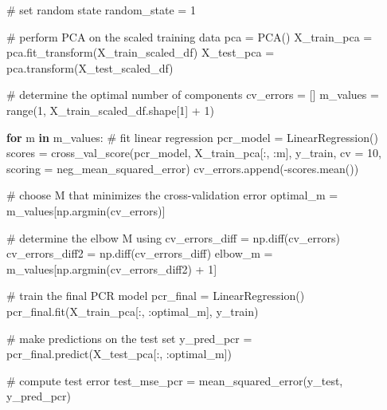 \documentclass[
  letterpaper,
  DIV=11,
  numbers=noendperiod]{scrartcl}
\newenvironment{Shaded}{\begin{snugshade}}{\end{snugshade}}
\newcommand{\BuiltInTok}[1]{\textcolor[rgb]{0.00,0.23,0.31}{#1}}
\newcommand{\CommentTok}[1]{\textcolor[rgb]{0.37,0.37,0.37}{#1}}
\newcommand{\ControlFlowTok}[1]{\textcolor[rgb]{0.00,0.23,0.31}{\textbf{#1}}}
\newcommand{\DecValTok}[1]{\textcolor[rgb]{0.68,0.00,0.00}{#1}}
\newcommand{\KeywordTok}[1]{\textcolor[rgb]{0.00,0.23,0.31}{\textbf{#1}}}
\newcommand{\NormalTok}[1]{\textcolor[rgb]{0.00,0.23,0.31}{#1}}
\newcommand{\OperatorTok}[1]{\textcolor[rgb]{0.37,0.37,0.37}{#1}}
\newcommand{\StringTok}[1]{\textcolor[rgb]{0.13,0.47,0.30}{#1}}
\begin{document}
\begin{Shaded}
\begin{Highlighting}[]
\CommentTok{\# set random state }
\NormalTok{random\_state }\OperatorTok{=} \DecValTok{1}

\CommentTok{\# perform PCA on the scaled training data}
\NormalTok{pca }\OperatorTok{=}\NormalTok{ PCA()}
\NormalTok{X\_train\_pca }\OperatorTok{=}\NormalTok{ pca.fit\_transform(X\_train\_scaled\_df)}
\NormalTok{X\_test\_pca }\OperatorTok{=}\NormalTok{ pca.transform(X\_test\_scaled\_df)}

\CommentTok{\# determine the optimal number of components }
\NormalTok{cv\_errors }\OperatorTok{=}\NormalTok{ []}
\NormalTok{m\_values }\OperatorTok{=} \BuiltInTok{range}\NormalTok{(}\DecValTok{1}\NormalTok{, X\_train\_scaled\_df.shape[}\DecValTok{1}\NormalTok{] }\OperatorTok{+} \DecValTok{1}\NormalTok{)}

\ControlFlowTok{for}\NormalTok{ m }\KeywordTok{in}\NormalTok{ m\_values:}
    \CommentTok{\# fit linear regression}
\NormalTok{    pcr\_model }\OperatorTok{=}\NormalTok{ LinearRegression()}
\NormalTok{    scores }\OperatorTok{=}\NormalTok{ cross\_val\_score(pcr\_model, X\_train\_pca[:, :m], y\_train, }
\NormalTok{                             cv }\OperatorTok{=} \DecValTok{10}\NormalTok{, scoring }\OperatorTok{=} \StringTok{\textquotesingle{}neg\_mean\_squared\_error\textquotesingle{}}\NormalTok{)}
\NormalTok{    cv\_errors.append(}\OperatorTok{{-}}\NormalTok{scores.mean())  }

\CommentTok{\# choose M that minimizes the cross{-}validation error}
\NormalTok{optimal\_m }\OperatorTok{=}\NormalTok{ m\_values[np.argmin(cv\_errors)]}

\CommentTok{\# determine the elbow M using}
\NormalTok{cv\_errors\_diff }\OperatorTok{=}\NormalTok{ np.diff(cv\_errors)  }
\NormalTok{cv\_errors\_diff2 }\OperatorTok{=}\NormalTok{ np.diff(cv\_errors\_diff)  }
\NormalTok{elbow\_m }\OperatorTok{=}\NormalTok{ m\_values[np.argmin(cv\_errors\_diff2) }\OperatorTok{+} \DecValTok{1}\NormalTok{] }

\CommentTok{\# train the final PCR model}
\NormalTok{pcr\_final }\OperatorTok{=}\NormalTok{ LinearRegression()}
\NormalTok{pcr\_final.fit(X\_train\_pca[:, :optimal\_m], y\_train)}

\CommentTok{\# make predictions on the test set}
\NormalTok{y\_pred\_pcr }\OperatorTok{=}\NormalTok{ pcr\_final.predict(X\_test\_pca[:, :optimal\_m])}

\CommentTok{\# compute test error}
\NormalTok{test\_mse\_pcr }\OperatorTok{=}\NormalTok{ mean\_squared\_error(y\_test, y\_pred\_pcr)}


\end{Highlighting}
\end{Shaded}
\end{document}
